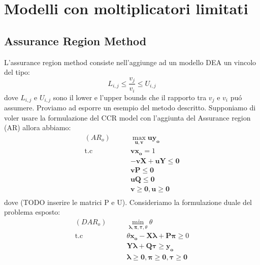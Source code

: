\chapter{Modelli con moltiplicatori limitati} \label{CAP:quattro}
\section{Assurance Region Method}
\bigskip

L'assurance region method consiste nell'aggiunge ad un modello DEA un vincolo del tipo:
\begin{equation}
L_{i,j} \leq \frac{v_j}{v_i} \leq U_{i,j}
\end{equation}
dove $L_{i,j}$ e $U_{i,j}$ sono il lower e l'upper bounds che il rapporto tra $v_j$ e $v_i$ pu\'o assumere. Proviamo ad esporre un esempio del metodo descritto. Supponiamo di voler usare la formulazione del CCR model con l'aggiunta del Assurance region (AR) allora abbiamo:
\begin{equation} 
\begin{split}
(AR_o) \qquad & \max_{\boldsymbol{u,v}} \boldsymbol{uy_o} \\
\text{t.c} \qquad & \boldsymbol{vx_o} = 1 \\
& \boldsymbol{-vX + uY \leq 0 } \\
& \boldsymbol{vP \leq 0} \\
& \boldsymbol{uQ \leq 0} \\
& \boldsymbol{v \geq 0, u \geq 0} \\
\end{split}
\end{equation}
dove (TODO inserire le matrici P e U). Consideriamo la formulazione duale del problema esposto:
\begin{equation}
\begin{split}
(DAR_o) \qquad & \min_{\boldsymbol{\lambda, \pi, \tau,} \theta} \theta \\
\text{t.c} \qquad & \theta\boldsymbol{x_o - X\lambda + P\pi} \geq 0 \\
& \boldsymbol{Y\lambda + Q\tau \geq y_o } \\
& \boldsymbol{\lambda \geq 0, \pi \geq 0, \tau \geq 0} \\
\end{split}
\end{equation}
